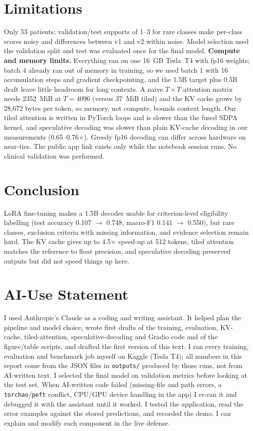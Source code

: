 \documentclass[conference]{IEEEtran}
\begin{document}
\section{Limitations}
Only 53 patients; validation/test supports of 1--3 for rare classes make per-class scores noisy and differences between v1 and v2 within noise. Model selection used the validation split and test was evaluated once for the final model. \textbf{Compute and memory limits.} Everything ran on one 16~GB Tesla~T4 with fp16 weights; batch 4 already ran out of memory in training, so we used batch 1 with 16 accumulation steps and gradient checkpointing, and the 1.5B target plus 0.5B draft leave little headroom for long contexts. A naive $T\times T$ attention matrix needs 2352~MiB at $T{=}4096$ (versus 37~MiB tiled) and the KV cache grows by 28{,}672 bytes per token, so memory, not compute, bounds context length. Our tiled attention is written in PyTorch loops and is slower than the fused SDPA kernel, and speculative decoding was slower than plain KV-cache decoding in our measurements (0.65--0.76$\times$). Greedy fp16 decoding can differ across hardware on near-ties. The public app link exists only while the notebook session runs. No clinical validation was performed.

\section{Conclusion}
LoRA fine-tuning makes a 1.5B decoder usable for criterion-level eligibility labelling (test accuracy 0.107 $\rightarrow$ 0.748, macro-F1 0.141 $\rightarrow$ 0.550), but rare classes, exclusion criteria with missing information, and evidence selection remain hard. The KV cache gives up to 4.5$\times$ speed-up at 512 tokens, tiled attention matches the reference to float precision, and speculative decoding preserved outputs but did not speed things up here.

\appendices
\section{AI-Use Statement}
I used Anthropic's Claude as a coding and writing assistant. It helped plan the pipeline and model choice, wrote first drafts of the training, evaluation, KV-cache, tiled-attention, speculative-decoding and Gradio code and of the figure/table scripts, and drafted the first version of this text. I ran every training, evaluation and benchmark job myself on Kaggle (Tesla T4); all numbers in this report come from the JSON files in \texttt{outputs/} produced by those runs, not from AI-written text. I selected the final model on validation metrics before looking at the test set. When AI-written code failed (missing-file and path errors, a \texttt{torchao}/\texttt{peft} conflict, CPU/GPU device handling in the app) I re-ran it and debugged it with the assistant until it worked. I tested the application, read the error examples against the stored predictions, and recorded the demo. I can explain and modify each component in the live defense.
\end{document}
